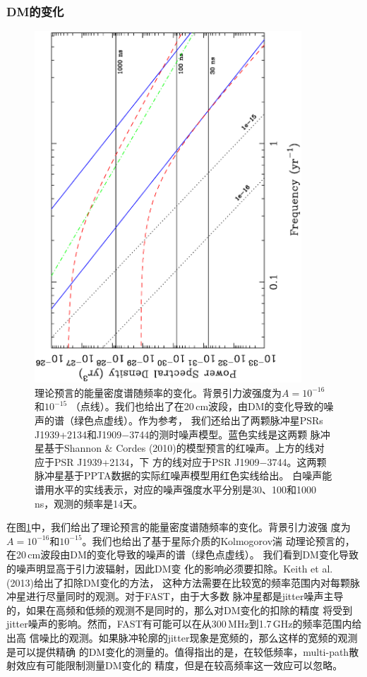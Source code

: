\subsubsection{DM的变化}

\begin{figure}
\begin{center}
\includegraphics[angle=-90,width=10cm]{noiseLimits.ps}
\caption{理论预言的能量密度谱随频率的变化。背景引力波强度为$A = 10^{-16}$和$10^{-15}$
（点线）。我们也给出了在20\,cm波段，由DM的变化导致的噪声的谱（绿色点虚线）。作为参考，
我们还给出了两颗脉冲星PSRs J1939+2134和J1909$-$3744的测时噪声模型。蓝色实线是这两颗
脉冲星基于Shannon \& Cordes (2010)的模型预言的红噪声。上方的线对应于PSR J1939+2134，下
方的线对应于PSR J1909$-$3744。这两颗脉冲星基于PPTA数据的实际红噪声模型用红色实线给出。
白噪声能谱用水平的实线表示，对应的噪声强度水平分别是30、100和1000\,ns，观测的频率是14天。} 
\label{fg:noise}
\end{center}
\end{figure}

在图\ref{fg:noise}中，我们给出了理论预言的能量密度谱随频率的变化。背景引力波强
度为$A = 10^{-16}$和$10^{-15}$。我们也给出了基于星际介质的Kolmogorov湍
动理论预言的，在20\,cm波段由DM的变化导致的噪声的谱（绿色点虚线）。
我们看到DM变化导致的噪声明显高于引力波辐射，因此DM变
化的影响必须要扣除。Keith et al. (2013)\supercite{Keith13}给出了扣除DM变化的方法，
这种方法需要在比较宽的频率范围内对每颗脉冲星进行尽量同时的观测。对于FAST，由于大多数
脉冲星都是jitter噪声主导的，如果在高频和低频的观测不是同时的，那么对DM变化的扣除的精度
将受到jitter噪声的影响。然而，FAST有可能可以在从300\,MHz到1.7\,GHz的频率范围内给出高
信噪比的观测。如果脉冲轮廓的jitter现象是宽频的，那么这样的宽频的观测是可以提供精确
的DM变化的测量的。值得指出的是，在较低频率，multi-path散射效应有可能限制测量DM变化的
精度，但是在较高频率这一效应可以忽略。

